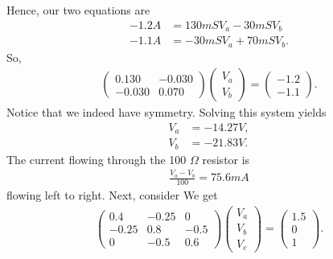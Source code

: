 \documentclass{report}
\begin{document}
\begin{itemize}
             Hence, our two equations are 
             \begin{align*}
                 -1.2A &= 130mSV_{a} - 30mSV_{b} \\
                 -1.1A &= -30mSV_{a} + 70mSV_{b}
             .\end{align*}
             So,
             \begin{align*}
                 \begin{pmatrix} 0.130 & -0.030 \\ -0.030 & 0.070 \end{pmatrix}\begin{pmatrix} V_{a} \\ V_{b} \end{pmatrix} = \begin{pmatrix} -1.2 \\ -1.1 \end{pmatrix}
             .\end{align*}
             Notice that we indeed have symmetry. Solving this system yields
             \begin{align*}
                 V_{a} &= -14.27V, \\
                 V_{b} &= -21.83V
             .\end{align*}
             The current flowing through the 100 $\Omega$ resistor is 
             \begin{align*}
                 \frac{V_{a} - V_{b}}{100} = 75.6mA
             \end{align*}
             flowing left to right.
             \bigbreak \noindent 
             Next, consider
             \bigbreak \noindent 
             \bigbreak \noindent 
             We get
             \begin{align*}
                 \begin{pmatrix} 0.4  & -0.25 & 0 \\ -0.25 & 0.8 & -0.5 \\ 0 & -0.5 & 0.6 \end{pmatrix} \begin{pmatrix} V_{a} \\ V_{b} \\ V_{c} \end{pmatrix} = \begin{pmatrix} 1.5 \\ 0 \\ 1 \end{pmatrix}
             .\end{align*}

\end{itemize}
\end{document}
